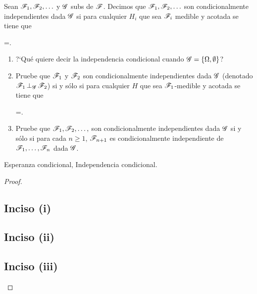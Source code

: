 \begin{problema}
	Sean $\mathscr{F}_1,\mathscr{F}_2,\ldots $ y $\mathscr{G}$ sub\sa s de $\mathscr{F}$. 
	Decimos que $\mathscr{F}_1,\mathscr{F}_2,\ldots$ son condicionalmente independientes dada $\mathscr{G}$ si para 
	cualquier $H_i$ que sea $\mathscr{F}_i$ medible y acotada se tiene que
	
	\begin{esn}
		=\cdots {}.
	\end{esn}
	
	\begin{enumerate}
		\item[(i)]	[\ref{problema4_1:inciso1}]
			?`Qu\'e quiere decir la independencia condicional cuando $\mathscr{G}=\left\{  \Omega ,\emptyset\right\} $?
			\pn

		\item[(ii)] 	[\ref{problema4_1:inciso2}]
			Pruebe que $\mathscr{F}_1$ y $\mathscr{F}_2$ son condicionalmente independientes dada $\mathscr{G}$ 
			(denotado $\condind{\F_1}{\F_2}{\G}$) si y s\'olo si para 
			cualquier $H$ que sea $\mathscr{F}_1$-medible y acotada se tiene que
			\begin{esn}
				=\espc{H}{\G}.
			\end{esn}

		\item[(iii)]	[\ref{problema4_1:inciso3}]
			Pruebe que $\mathscr{F}_1,\mathscr{F}_2,\ldots, $ son condicionalmente independientes dada 
			$\mathscr{G}$ si y s\'olo si para cada $n\geq 1$, $\mathscr{F}_{n+1}$ es condicionalmente 
			independiente de $\mathscr{F}_1,\ldots, \mathscr{F}_n$ dada $\mathscr{G}$. 
	\end{enumerate}

	 Esperanza condicional, Independencia condicional.
\end{problema}

\begin{proof}
    \subsection{Inciso (i)} \label{problema4_1:inciso1}
    
    \newpage

    \subsection{Inciso (ii)} \label{problema4_1:inciso2}
    
    \newpage

    \subsection{Inciso (iii)} \label{problema4_1:inciso3}
    
\end{proof}